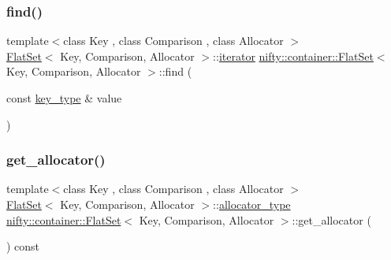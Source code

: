 \mbox{\label{classnifty_1_1container_1_1FlatSet_ac78650ca9a84bc0a8324a9aa03f626d4}} 
\subsubsection{\texorpdfstring{find()}{find()}\hspace{0.1cm}{\footnotesize\ttfamily [2/2]}}
{\footnotesize\ttfamily template$<$class Key , class Comparison , class Allocator $>$ \\
\hyperlink{classnifty_1_1container_1_1FlatSet}{Flat\+Set}$<$ Key, Comparison, Allocator $>$\+::\hyperlink{classnifty_1_1container_1_1FlatSet_a9c7fd20cd6b1878ccb8a7e068072c795}{iterator} \hyperlink{classnifty_1_1container_1_1FlatSet}{nifty\+::container\+::\+Flat\+Set}$<$ Key, Comparison, Allocator $>$\+::find (\begin{DoxyParamCaption}\item[{const \hyperlink{classnifty_1_1container_1_1FlatSet_a0101a4574052389646be8d9bf092a949}{key\+\_\+type} \&}]{value }\end{DoxyParamCaption})\hspace{0.3cm}{\ttfamily [inline]}}

\mbox{\label{classnifty_1_1container_1_1FlatSet_a1e302c2990cee7d044e0793fdb0dcf7f}} 
\subsubsection{\texorpdfstring{get\+\_\+allocator()}{get\_allocator()}}
{\footnotesize\ttfamily template$<$class Key , class Comparison , class Allocator $>$ \\
\hyperlink{classnifty_1_1container_1_1FlatSet}{Flat\+Set}$<$ Key, Comparison, Allocator $>$\+::\hyperlink{classnifty_1_1container_1_1FlatSet_aafc00d7d957c81f01ee8cd5dcabb4c78}{allocator\+\_\+type} \hyperlink{classnifty_1_1container_1_1FlatSet}{nifty\+::container\+::\+Flat\+Set}$<$ Key, Comparison, Allocator $>$\+::get\+\_\+allocator (\begin{DoxyParamCaption}{ }\end{DoxyParamCaption}) const\hspace{0.3cm}{\ttfamily [inline]}}

